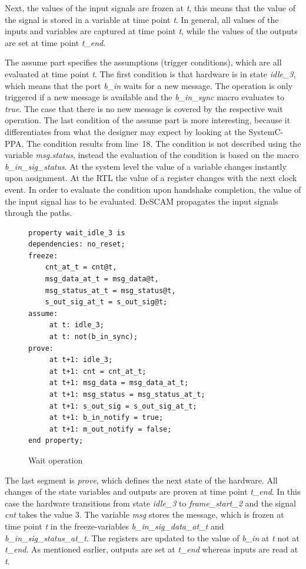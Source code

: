 Next, the values of the input signals are frozen at \textit{t}, this means that the value of the signal is stored in a variable at time point \textit{t}. 
In general, all values of the inputs and variables are captured at time point \textit{t}, while the values of the outputs are set at time point \textit{t\_end}. 

The assume part specifies the assumptions (trigger conditions), which are all evaluated at time point \textit{t}. 
The first condition is that hardware is in state \textit{idle\_3}, which means that the port \textit{b\_in} waits for a new message.
The operation is only triggered if a new message is available and the \textit{b\_in\_sync} macro evaluates to \textit{true}. 
The case that there is no new message is covered by the respective wait operation.
The last condition of the assume part is more interesting, because it differentiates from what the designer may expect by looking at the SystemC-PPA. 
The condition results from line~18. The condition is not described using the variable \textit{msg.status}, instead the evaluation of the condition is based on the macro \textit{b\_in\_sig\_status}. 
At the system level the value of a variable changes instantly upon assignment. 
At the RTL the value of a register changes with the next clock event. 
In order to evaluate the condition upon handshake completion, the value of the input signal has to be evaluated. 
DeSCAM propagates the input signals through the paths. 

\begin{figure}
	\vspace{-20pt}
	\caption{Wait operation}
\begin{verbatim}
property wait_idle_3 is
dependencies: no_reset;
freeze:
	cnt_at_t = cnt@t,
	msg_data_at_t = msg_data@t,
	msg_status_at_t = msg_status@t,
	s_out_sig_at_t = s_out_sig@t;
assume:
	 at t: idle_3;
	 at t: not(b_in_sync);
prove:
	 at t+1: idle_3;
	 at t+1: cnt = cnt_at_t;
	 at t+1: msg_data = msg_data_at_t;
	 at t+1: msg_status = msg_status_at_t;
	 at t+1: s_out_sig = s_out_sig_at_t;
	 at t+1: b_in_notify = true;
	 at t+1: m_out_notify = false;
end property;
\end{verbatim}
\end{figure}

The last segment is \textit{prove}, which defines the next state of the hardware. 
All changes of the state variables and outputs are proven at time point \textit{t\_end}. 
In this case the hardware transitions from state \textit{idle\_3} to \textit{frame\_start\_2} and the signal \textit{cnt} takes the value 3.
The variable \textit{msg} stores the message, which is frozen at time point \textit{t} in the freeze-variables \textit{b\_in\_sig\_data\_at\_t} and \textit{b\_in\_sig\_status\_at\_t}. 
The registers are updated to the value of \textit{b\_in} at \textit{t} not at \textit{t\_end}. 
As mentioned earlier, outputs are set at \textit{t\_end} whereas inputs are read at \textit{t}. 

